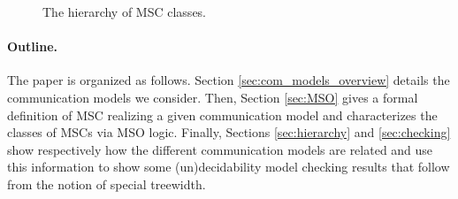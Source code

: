 \begin{figure}[h]
	\centering
	\caption{The hierarchy of MSC classes.}
	\label{fig:msc_hierarchy_full}
\end{figure}



\paragraph{Outline.} The paper is organized as follows. Section \ref{sec:com_models_overview} details the communication models we consider.  Then, Section \ref{sec:MSO} gives a formal definition of MSC realizing a given communication model and characterizes the classes of MSCs via MSO logic. Finally, Sections \ref{sec:hierarchy} and \ref{sec:checking} show respectively how the different communication models are related and use this information to show some (un)decidability model checking results that follow from the notion of special treewidth.

